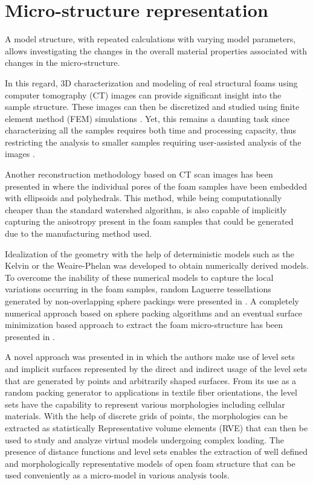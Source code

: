 \section{Micro-structure representation}

A model structure, with repeated calculations with varying model parameters, allows investigating the changes in the overall material properties associated with changes in the micro-structure. 

In this regard, 3D characterization and modeling of real structural foams using computer tomography (CT) images can provide significant insight into the sample structure. These images can then be discretized and studied using finite element method (FEM) simulations \cite{veyhlFiniteElementAnalysis2011,fiedlerMCTbasedFiniteElement2012,fiedlerComputedTomographyBased2009}. Yet, this remains a daunting task since characterizing all the samples requires both time and processing capacity, thus restricting the analysis to smaller samples requiring user-assisted analysis of the images \cite{montminy3DStructureReal2004}. 

Another reconstruction methodology based on CT scan images has been presented in \cite{leblancAnalysisOpenFoamUnderPreparation} where the individual pores of the foam samples have been embedded with ellipsoids and polyhedrals. This method, while being computationally cheaper than the standard watershed algorithm\cite{lautensackFittingThreedimensionalLaguerre2008}, is also capable of implicitly capturing the anisotropy present in the foam samples that could be generated due to the manufacturing method used. 

Idealization of the geometry with the help of deterministic models such as the Kelvin\cite{thomsonLXIIIDivisionSpace1887} or the Weaire-Phelan\cite{weaireCounterexampleKelvinConjecture1994} was developed to obtain numerically derived models. To overcome the inability of these numerical models to capture the local variations occurring in the foam samples, random Laguerre tessellations generated by non-overlapping sphere packings were presented in \cite{redenbachMicrostructureModelsCellular2009}. A completely numerical approach based on sphere packing algorithms and an eventual surface minimization based approach to extract the foam micro-structure has been presented in \cite{kraynikStructureRandomFoam2004}. 

A novel approach was presented in \cite{sononAdvancedTechniquesGeneration2014} in which the authors make use of level sets and implicit surfaces represented by the direct and indirect usage of the level sets that are generated by points and arbitrarily shaped surfaces. From its use as a random packing generator to applications in textile fiber orientations, the level sets have the capability to represent various morphologies including cellular materials. With the help of discrete grids of points, the morphologies can be extracted as statistically Representative volume elements (RVE) that can then be used to study and analyze virtual models undergoing complex loading. The presence of distance functions and level sets enables the extraction of well defined and morphologically representative models of open foam structure that can be used conveniently as a micro-model in various analysis tools.

